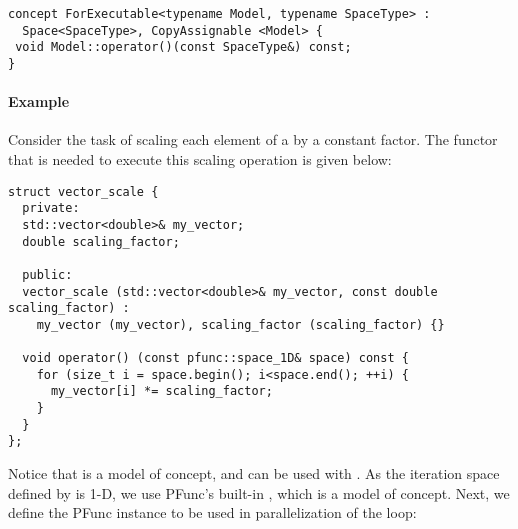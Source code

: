 \begin{center}
\begin{minipage}{0.6\textwidth}
\begin{lstlisting}
concept ForExecutable<typename Model, typename SpaceType> : 
  Space<SpaceType>, CopyAssignable <Model> {
 void Model::operator()(const SpaceType&) const;
}
\end{lstlisting}
\end{minipage}
\end{center}

\paragraph{Example} Consider the task of scaling each element of a 
 by a constant factor.
%
The functor that is needed to execute this scaling operation is given below:
%
\begin{center}
\begin{minipage}{0.8\textwidth}
\begin{lstlisting}
struct vector_scale {
  private:
  std::vector<double>& my_vector;
  double scaling_factor;

  public:
  vector_scale (std::vector<double>& my_vector, const double scaling_factor) :
    my_vector (my_vector), scaling_factor (scaling_factor) {}

  void operator() (const pfunc::space_1D& space) const {
    for (size_t i = space.begin(); i<space.end(); ++i) {
      my_vector[i] *= scaling_factor;
    }
  }
};
\end{lstlisting}
\end{minipage}
\end{center}
%
Notice that  is a model of  concept,
and can be used with .
%
As the iteration space defined by  is 1-D, we use PFunc's 
built-in , which is a model of  concept.
%
Next, we define the PFunc instance to be used in parallelization of the
 loop:

